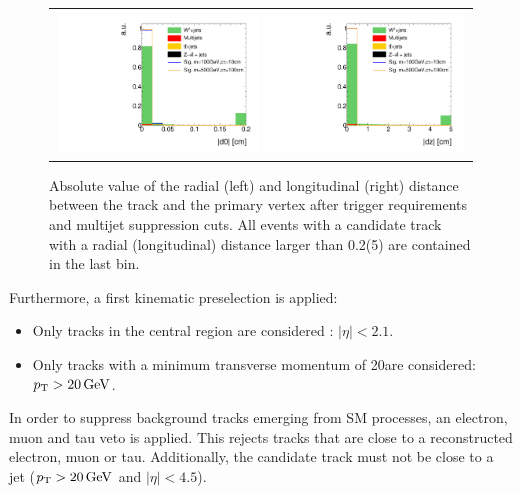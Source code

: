 \begin{figure}[!t]
  \centering 
  \begin{tabular}{c}
    \includegraphics[width=0.49\textwidth]{figures/analysis/AnalysisSelection/chiTracksQCDsupressionTrigger_2Signals_FullBkg/htrackd0_lin.pdf}
    \includegraphics[width=0.49\textwidth]{figures/analysis/AnalysisSelection/chiTracksQCDsupressionTrigger_2Signals_FullBkg/htrackdz_lin.pdf}
  \end{tabular}
  \caption{Absolute value of the radial (left) and longitudinal (right) distance between the track and the primary vertex after trigger requirements and multijet suppression cuts. 
           All events with a candidate track with a radial (longitudinal) distance larger than 0.2\cm (5\cm) are contained in the last bin.}
  \label{fig:d0_dz}
\end{figure}

Furthermore, a first kinematic preselection is applied:
\begin{itemize}
\renewcommand{\labelitemi}{\footnotesize{\ding{118}}}
\item Only tracks in the central region are considered : $|\eta|<2.1$.
\item Only tracks with a minimum transverse momentum of 20\gev are considered: \mbox{$p_{\text{T}}>20\,\text{Ge}\kern-0.06667em\text{V}$}.\\
\end{itemize}

In order to suppress background tracks emerging from SM processes, an electron, muon and tau veto is applied.
This rejects tracks that are close to a reconstructed electron, muon or tau.
Additionally, the candidate track must not be close to a jet ($p_{\text{T}}>20\,\text{Ge}\kern-0.06667em\text{V}$ and $|\eta|<4.5$).


